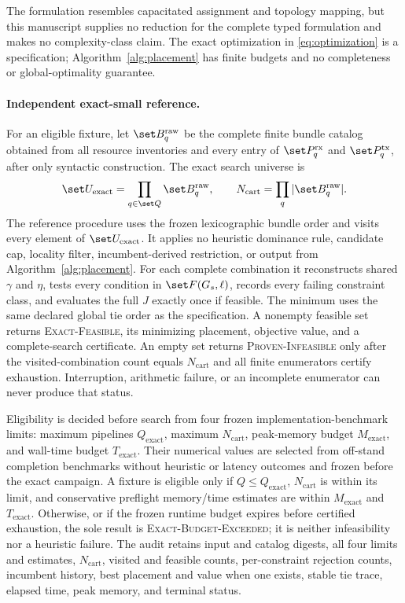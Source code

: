 The formulation resembles capacitated assignment and topology mapping, but this manuscript supplies no reduction for the complete typed formulation and makes no complexity-class claim. The exact optimization in \cref{eq:optimization} is a specification; Algorithm~\ref{alg:placement} has finite budgets and no completeness or global-optimality guarantee.

\paragraph{Independent exact-small reference.}
For an eligible fixture, let $\set B_q^{\mathrm{raw}}$ be the complete finite bundle catalog obtained from all resource inventories and every entry of $\set P_q^{\mathrm{rx}}$ and $\set P_q^{\mathrm{tx}}$, after only syntactic construction. The exact search universe is
\begin{equation}
 \set U_{\mathrm{exact}}=\prod_{q\in\set Q}\set B_q^{\mathrm{raw}},
 \qquad N_{\mathrm{cart}}=\prod_q|\set B_q^{\mathrm{raw}}|.
 \label{eq:exact-universe}
\end{equation}
The reference procedure uses the frozen lexicographic bundle order and visits every element of $\set U_{\mathrm{exact}}$. It applies no heuristic dominance rule, candidate cap, locality filter, incumbent-derived restriction, or output from Algorithm~\ref{alg:placement}. For each complete combination it reconstructs shared $\gamma$ and $\eta$, tests every condition in $\set F(G_s,\ell)$, records every failing constraint class, and evaluates the full $J$ exactly once if feasible. The minimum uses the same declared global tie order as the specification. A nonempty feasible set returns \textsc{Exact-Feasible}, its minimizing placement, objective value, and a complete-search certificate. An empty set returns \textsc{Proven-Infeasible} only after the visited-combination count equals $N_{\mathrm{cart}}$ and all finite enumerators certify exhaustion. Interruption, arithmetic failure, or an incomplete enumerator can never produce that status.

Eligibility is decided before search from four frozen implementation-benchmark limits: maximum pipelines $Q_{\mathrm{exact}}$, maximum $N_{\mathrm{cart}}$, peak-memory budget $M_{\mathrm{exact}}$, and wall-time budget $T_{\mathrm{exact}}$. Their numerical values are selected from off-stand completion benchmarks without heuristic or latency outcomes and frozen before the exact campaign. A fixture is eligible only if $Q\leq Q_{\mathrm{exact}}$, $N_{\mathrm{cart}}$ is within its limit, and conservative preflight memory/time estimates are within $M_{\mathrm{exact}}$ and $T_{\mathrm{exact}}$. Otherwise, or if the frozen runtime budget expires before certified exhaustion, the sole result is \textsc{Exact-Budget-Exceeded}; it is neither infeasibility nor a heuristic failure. The audit retains input and catalog digests, all four limits and estimates, $N_{\mathrm{cart}}$, visited and feasible counts, per-constraint rejection counts, incumbent history, best placement and value when one exists, stable tie trace, elapsed time, peak memory, and terminal status.


